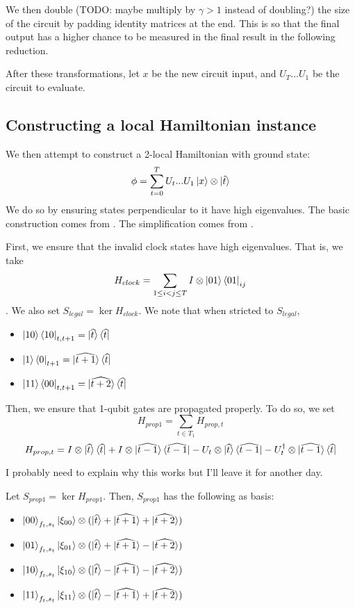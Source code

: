 \documentclass{article}
\theoremstyle{definition}
\begin{document}
We then double (TODO: maybe multiply by $\gamma>1$ instead of doubling?) the size of the circuit by padding identity matrices at the end. This is so that the final output has a higher chance to be measured in the final result in the following reduction.

After these transformations, let $x$ be the new circuit input, and $U_T...U_1$ be the circuit to evaluate.

\subsection{Constructing a local Hamiltonian instance}

We then attempt to construct a 2-local Hamiltonian with ground state: $$\phi=\sum_{t=0}^TU_t...U_1\ket{x}\otimes\ket{\hat{t}}$$
We do so by ensuring states perpendicular to it have high eigenvalues. The basic construction comes from \cite{kitaev2002classical}. The simplification comes from \cite{biomonte_love_2008}.

First, we ensure that the invalid clock states have high eigenvalues. That is, we take $$H_{clock}=\sum_{1\leq i<j\leq T} I\otimes \ket{01}\bra{01}_{ij}$$. We also set $S_{legal}=\ker H_{clock}$.
We note that when stricted to $S_{legal}$, 
\begin{itemize}
	\item $\ket{10}\bra{10}_{t,t+1}
		=\ket{\widehat{t}}\bra{\widehat{t}}$ 
	\item $\ket{1}\bra{0}_{t+1}
		=\ket{\widehat{t+1}}\bra{\widehat{t}}$
	\item $\ket{11}\bra{00}_{t,t+1}
		=\ket{\widehat{t+2}}\bra{\widehat{t}}$
\end{itemize}

Then, we ensure that 1-qubit gates are propagated properly. To do so, we set
	$$H_{prop1}=\sum_{t\in T_1}H_{prop,t}$$
	$$H_{prop,t}=I\otimes\ket{\widehat{t}}\bra{\widehat{t}}
		+I\otimes\ket{\widehat{t-1}}\bra{\widehat{t-1}}
		-U_t\otimes\ket{\widehat{t}}\bra{\widehat{t-1}}
		-U_t^\dagger\otimes\ket{\widehat{t-1}}\bra{\widehat{t}}$$

I probably need to explain why this works but I'll leave it for another day.

Let $S_{prop1}=\ker H_{prop1}$.
Then, $S_{prop1}$ has the following as basis:
\begin{itemize}
	\item $\ket{00}_{f_t,s_t}\ket{\xi_{00}}\otimes
		(\ket{\widehat{t}}+\ket{\widehat{t+1}}+\ket{\widehat{t+2}})$
	\item $\ket{01}_{f_t,s_t}\ket{\xi_{01}}\otimes
		(\ket{\widehat{t}}+\ket{\widehat{t+1}}-\ket{\widehat{t+2}})$
	\item $\ket{10}_{f_t,s_t}\ket{\xi_{10}}\otimes
		(\ket{\widehat{t}}-\ket{\widehat{t+1}}-\ket{\widehat{t+2}})$
	\item $\ket{11}_{f_t,s_t}\ket{\xi_{11}}\otimes
		(\ket{\widehat{t}}-\ket{\widehat{t+1}}+\ket{\widehat{t+2}})$
\end{itemize}
\end{document}
